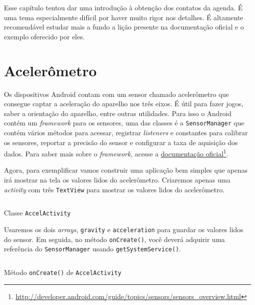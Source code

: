 \documentclass[a4paper,12pt,brazil]{book}
\begin{document}
\begin{singlespace}
	
		Esse capítulo tentou dar uma introdução à obtenção dos contatos da agenda. É uma tema especialmente difícil por haver muito rigor nos detalhes. É altamente recomendável estudar mais a fundo a lição presente na documentação oficial e o exemplo oferecido por eles. 

\chapter{Acelerômetro}
	Os dispositivos Android contam com um sensor chamado acelerômetro que consegue captar a aceleração do aparelho nos três eixos. É útil para fazer jogos, saber a orientação do aparelho, entre outras utilidades. Para isso o Android contém um \emph{framework} para os sensores, uma das classes é a \texttt{SensorManager} que contém vários métodos para acessar, registrar \emph{listeners} e constantes para calibrar os sensores, reportar a precisão do sensor e configurar a taxa de aquisição dos dados. Para saber mais sobre o \emph{framework}, acesse a \href{http://developer.android.com/guide/topics/sensors/sensors\_overview.html}{documentação oficial}\footnote{\href{http://developer.android.com/guide/topics/sensors/sensors\_overview.html}{http://developer.android.com/guide/topics/sensors/sensors\_overview.html}}.

	Agora, para exemplificar vamos construir uma aplicação bem simples que apenas irá mostrar na tela os valores lidos do acelerômetro. Criaremos apenas uma \emph{activity} com três \texttt{TextView} para mostrar os valores lidos do acelerômetro.

	\begin{listing}[H]
	\inputminted[linenos=true,fontsize=\small,frame=lines, framesep=2mm, tabsize=2,numbersep=5pt]{java}{src/api/accelerometer/activity.java}
	\caption{Classe \texttt{AccelActivity}}
	\label{code:accelactivity}
	\end{listing} 			

	Usaremos os dois \emph{arrays}, \texttt{gravity} e \texttt{acceleration} para guardar os valores lidos do sensor. Em seguida, no método \texttt{onCreate()}, você deverá adquirir uma referência do \texttt{SensorManager} usando \texttt{getSystemService()}.

	\begin{listing}[H]
	\inputminted[linenos=true,fontsize=\small,frame=lines, framesep=2mm, tabsize=2,numbersep=5pt]{java}{src/api/accelerometer/oncreate.java}
	\caption{Método \texttt{onCreate()} de \texttt{AccelActivity}}
	\label{code:accelactivitycreate}
	\end{listing} 			


\end{singlespace}
\end{document}
